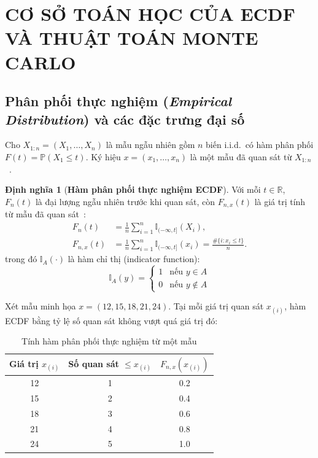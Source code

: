 \documentclass[12pt,a4paper]{article}
\theoremstyle{definition}
\newtheorem{definition}[theorem]{Định nghĩa}
\numberwithin{equation}{section}
\begin{document}

	\newpage
	\section{CƠ SỞ TOÁN HỌC CỦA ECDF VÀ THUẬT TOÁN MONTE CARLO}

	\subsection{Phân phối thực nghiệm (\textit{Empirical Distribution}) và các đặc trưng đại số}
	Cho $X_{1:n}=(X_1,\ldots,X_n)$ là mẫu ngẫu nhiên gồm $n$ biến i.i.d.\ có
    hàm phân phối $F(t)=\mathbb P(X_1\le t)$. Ký hiệu $x=(x_1,\ldots,x_n)$
    là một mẫu đã quan sát từ $X_{1:n}$~\cite[Chương 4]{buithuytrang2026}.

    \begin{definition}[\textbf{Hàm phân phối thực nghiệm ECDF}]
        Với mỗi $t\in\mathbb R$, $F_n(t)$ là đại lượng ngẫu nhiên trước khi
        quan sát, còn $F_{n,x}(t)$ là giá trị tính từ mẫu đã quan sát~\cite[Chương 4]{buithuytrang2026}:
        \begin{equation}
            \begin{aligned}
                F_n(t)&=\frac1n\sum_{i=1}^n \mathbb I_{(-\infty,t]}(X_i),\\
                F_{n,x}(t)&=\frac1n\sum_{i=1}^n\mathbb I_{(-\infty,t]}(x_i)
                    =\frac{\#\{i:x_i\le t\}}{n}.
            \end{aligned}
        \end{equation}
        trong đó $\mathbb{I}_A(\cdot)$ là hàm chỉ thị (indicator function):
		\begin{equation}
			\mathbb{I}_A(y) = \begin{cases}
				1 & \text{nếu } y \in A \\
				0 & \text{nếu } y \notin A
			\end{cases}
		\end{equation}
	\end{definition}
		Xét mẫu minh họa $x=(12,15,18,21,24)$. Tại mỗi giá trị quan sát
		$x_{(i)}$, hàm ECDF bằng tỷ lệ số quan sát không vượt quá giá trị đó:

		\begin{table}[htbp]
			\centering
			\caption{Tính hàm phân phối thực nghiệm từ một mẫu}
			\label{tab:ecdf-values}
			\begin{tabular}{ccc}
				\toprule
				Giá trị $x_{(i)}$ & Số quan sát $\leq x_{(i)}$ & $F_{n,x}(x_{(i)})$ \\
				\midrule
				12 & 1 & 0.2 \\
				15 & 2 & 0.4 \\
				18 & 3 & 0.6 \\
				21 & 4 & 0.8 \\
				24 & 5 & 1.0 \\
				\bottomrule
			\end{tabular}
		\end{table}
\end{document}
